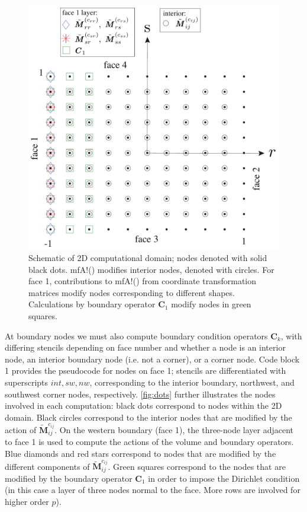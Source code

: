 \begin{figure}
    \centering
    \includegraphics[width=\linewidth]{figures/dots_mod3.pdf}
    \caption{Schematic of 2D computational domain; nodes denoted with solid black dots. {\ttfamily mfA!}() modifies interior nodes, denoted with circles. For face 1, contributions to {\ttfamily mfA!}() from coordinate transformation matrices modify nodes corresponding to different shapes. Calculations by boundary operator $\boldsymbol{C}_1$ modify nodes in green squares.}
    \label{fig:dots}
\end{figure}


At boundary nodes we must also compute boundary condition operators $\boldsymbol{C}_k$, with differing stencils depending on face number and whether a node is an interior node, an interior boundary node (i.e. not a corner), or a corner node. Code block 1 provides the pseudocode for nodes on face 1; stencils are differentiated with superscripts $int, sw, nw$, corresponding to the interior boundary, northwest, and southwest corner nodes, respectively. \autoref{fig:dots} further illustrates the nodes involved in each computation: black dots correspond to nodes within the 2D domain. Black circles correspond to the interior nodes that are modified by the action of $\tilde{\boldsymbol{M}}^{c_{ij}}_{ij}$. On the western boundary (face 1), the three-node layer adjacent to face 1 is used to compute the actions of the volume and boundary operators.  Blue diamonds and red stars correspond to nodes that are modified by the different components of $\tilde{\boldsymbol{M}}^{c_{ij}}_{ij}$. Green squares correspond to the nodes that are modified by the boundary operator $\boldsymbol{C}_1$ in order to impose the Dirichlet condition (in this case a layer of three nodes normal to the face. More rows are involved for higher order $p$). 

